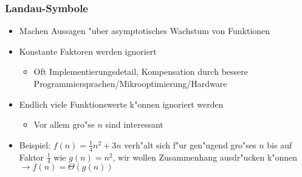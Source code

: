 \documentclass[t]{beamer}
\begin{document}
\begin{frame}
  \frametitle{Landau-Symbole}
  \begin{itemize}
  \item Machen Aussagen "uber asymptotisches Wachstum von Funktionen
  \item Konstante Faktoren werden ignoriert
    \begin{itemize}
    \item Oft Implementierungsdetail, Kompensation durch
          bessere Programmiersprachen/Mikrooptimierung/Hardware
    \end{itemize}
  \item Endlich viele Funktionswerte k"onnen ignoriert werden
    \begin{itemize}
    \item Vor allem gro"se $n$ sind interessant
    \end{itemize}
  \item Beispiel: $f(n) = \frac{1}{4}n^2 + 3n$ verh"alt sich f"ur gen"ugend gro"ses
        $n$ bis auf Faktor $\frac{1}{4}$ wie $g(n) = n^2$, wir wollen
        Zusammenhang ausdr"ucken k"onnen \\[1em]
          $\rightarrow f(n) = \Theta(g(n))$
  \end{itemize}
\end{frame}
\end{document}
